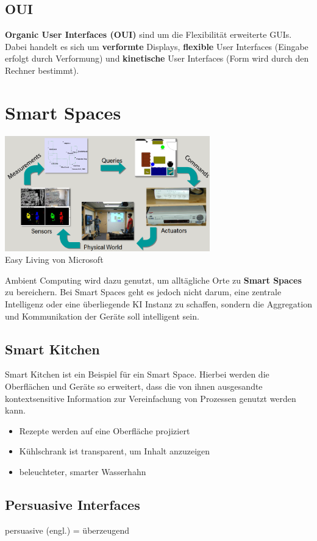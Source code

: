 \documentclass[a4paper]{article}
\begin{document}
\subsection{OUI}
\textbf{Organic User Interfaces (OUI)} sind um die Flexibilität erweiterte GUIs. Dabei handelt es sich um \textbf{verformte} Displays, \textbf{flexible} User Interfaces (Eingabe erfolgt durch Verformung) und \textbf{kinetische} User Interfaces (Form wird durch den Rechner bestimmt).

\newpage
\section{Smart Spaces}
\begin{center}
	\includegraphics[height = 5cm]{SmartSpace.png}\\
	Easy Living von Microsoft
\end{center}
Ambient Computing wird dazu genutzt, um alltägliche Orte zu \textbf{Smart Spaces} zu bereichern. Bei Smart Spaces geht es jedoch nicht darum, eine zentrale Intelligenz oder eine überliegende KI Instanz zu schaffen, sondern die Aggregation und Kommunikation der Geräte soll intelligent sein.
\subsection{Smart Kitchen}
Smart Kitchen ist ein Beispiel für ein Smart Space. Hierbei werden die Oberflächen und Geräte so erweitert, dass die von ihnen ausgesandte kontextsensitive Information zur Vereinfachung von Prozessen genutzt werden kann.
\begin{itemize}
	\item Rezepte werden auf eine Oberfläche projiziert
	\item Kühlschrank ist transparent, um Inhalt anzuzeigen
	\item beleuchteter, smarter Wasserhahn
\end{itemize}
\subsection{Persuasive Interfaces}
persuasive (engl.) = überzeugend\\
\end{document}
